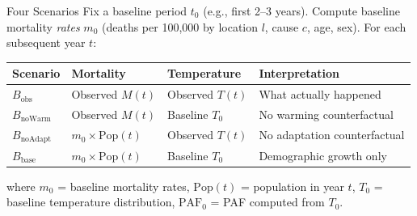 \documentclass[aspectratio=169,10pt]{beamer}
\begin{document}
\begin{frame}{Four Scenarios}
  Fix a baseline period $t_0$ (e.g., first 2--3 years). Compute baseline mortality \emph{rates} $m_0$ (deaths per 100,000 by location $l$, cause $c$, age, sex). For each subsequent year $t$:

  \vspace{0.3em}
  \begin{table}
    \small
    \begin{tabular}{@{}llll@{}}
      \toprule
      \textbf{Scenario} & \textbf{Mortality} & \textbf{Temperature} & \textbf{Interpretation} \\
      \midrule
      $B_{\text{obs}}$ & Observed $M(t)$ & Observed $T(t)$ & What actually happened \\[0.3em]
      $B_{\text{noWarm}}$ & Observed $M(t)$ & Baseline $T_0$ & No warming counterfactual \\[0.3em]
      $B_{\text{noAdapt}}$ & $m_0 \times \text{Pop}(t)$ & Observed $T(t)$ & No adaptation counterfactual \\[0.3em]
      $B_{\text{base}}$ & $m_0 \times \text{Pop}(t)$ & Baseline $T_0$ & Demographic growth only \\
      \bottomrule
    \end{tabular}
  \end{table}

  \vspace{0.3em}
  {\small where $m_0$ = baseline mortality rates, $\text{Pop}(t)$ = population in year $t$, $T_0$ = baseline temperature distribution, $\text{PAF}_0$ = PAF computed from $T_0$.}
\end{frame}
\end{document}
